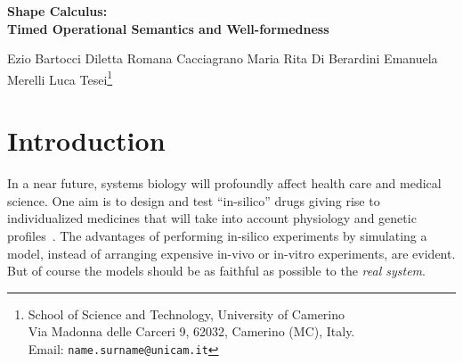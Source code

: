 \documentclass[11pt]{article}
\begin{document}
\vspace{1cm}
\begin{center}
{\Large\bf Shape Calculus:\\ Timed Operational Semantics and Well-formedness}
\end{center}
\vspace{4mm}

\begin{center}
{\large Ezio Bartocci \qquad
Diletta Romana Cacciagrano \qquad
Maria \nolinebreak[4] Rita \nolinebreak[4] Di \nolinebreak[4] Berardini \qquad
Emanuela Merelli \qquad
Luca Tesei}\footnote{School of Science and Technology, University of Camerino\\
Via Madonna delle Carceri 9, 62032, Camerino (MC), Italy.\\ Email:
\texttt{name.surname@unicam.it}}
\end{center}

\vspace{3ex}

\date{\ }


\begin{abstract}
The Shape Calculus is a bio-inspired calculus for describing 3D shapes moving in a space. A shape forms a 3D process when combined with a behaviour. Behaviours are specified with a timed CCS-like process algebra using a notion of channel that models naturally binding sites on the surface of shapes. Processes can represent molecules or other mobile objects and can be part of networks of processes that move simultaneously and interact in a given geometrical space. The calculus embeds collision detection and response, binding of compatible 3D processes and splitting of previously established bonds. In this work the full formal timed operational semantics of the calculus is provided, together with examples that illustrate the use of the calculus in a well-known biological scenario. Moreover, a result of well-formedness about the evolution of a given network of well-formed 3D processes is proved.
\end{abstract}

\section{Introduction}

In a near future, systems biology will profoundly affect health care and medical science. One aim is to design and test ``in-silico'' drugs giving rise to individualized medicines that will take into account physiology and genetic profiles~\cite{Finkelstein2004}. The advantages of performing in-silico experiments by simulating a model, instead of arranging expensive in-vivo or in-vitro experiments, are evident. But of course the models should be as faithful as possible to the \emph{real system}.
\end{document}
